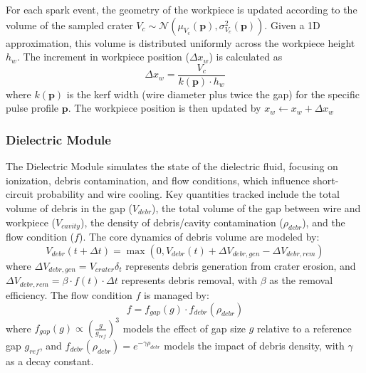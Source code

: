 \documentclass[5p,times,procedia]{elsarticle}
\begin{document}
For each spark event, the geometry of the workpiece is updated according to the volume of the sampled crater $V_c \sim \mathcal{N}(\mu_{V_c}(\mathbf{p}), \sigma_{V_c}^2(\mathbf{p}))$. Given a 1D approximation, this volume is distributed uniformly across the workpiece height $h_w$. The increment in workpiece position ($\Delta x_w$) is calculated as 
\begin{equation}
    \Delta x_w = \frac{V_c}{k(\mathbf{p}) \cdot h_w}
\end{equation}
 where $k(\mathbf{p})$ is the kerf width (wire diameter plus twice the gap) for the specific pulse profile $\mathbf{p}$. The workpiece position is then updated by $x_w \leftarrow x_w + \Delta x_w$

\subsubsection{Dielectric Module}

The Dielectric Module simulates the state of the dielectric fluid, focusing on ionization, debris contamination, and flow conditions, which influence short-circuit probability and wire cooling.
Key quantities tracked include the total volume of debris in the gap ($V_{debr}$), the total volume of the gap between wire and workpiece ($V_{cavity}$), the density of debris/cavity contamination ($\rho_{debr}$), and the flow condition ($f$).
The core dynamics of debris volume are modeled by:
\begin{equation}
    V_{debr}(t + \Delta t) = \max(0, V_{debr}(t) + \Delta V_{debr,gen} - \Delta V_{debr,rem})
\end{equation}
where $\Delta V_{debr,gen} = V_{crater}\delta_t$ represents debris generation from crater erosion, and $\Delta V_{debr,rem} = \beta \cdot f(t) \cdot \Delta t$ represents debris removal, with $\beta$ as the removal efficiency.
The flow condition $f$ is managed by:
\begin{equation}
    f = f_{gap}(g) \cdot f_{debr}(\rho_{debr})
\end{equation}
where $f_{gap}(g) \propto \left(\frac{g}{g_{ref}}\right)^3$ models the effect of gap size $g$ relative to a reference gap $g_{ref}$, and $f_{debr}(\rho_{debr}) = e^{-\gamma \rho_{debr}}$ models the impact of debris density, with $\gamma$ as a decay constant.


\end{document}
